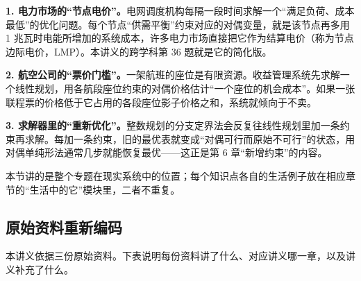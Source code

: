\begin{figure}[!htbp]\centering

\end{figure}
\begin{sciencebox}[三个真实系统里的对偶变量]
\textbf{1. 电力市场的“节点电价”。}电网调度机构每隔一段时间求解一个“满足负荷、成本最低”的优化问题。每个节点“供需平衡”约束对应的对偶变量，就是该节点再多用 1 兆瓦时电能所增加的系统成本，许多电力市场直接把它作为结算电价（称为节点边际电价，LMP）。本讲义的跨学科第 36 题就是它的简化版。

\smallskip
\textbf{2. 航空公司的“票价门槛”。}一架航班的座位是有限资源。收益管理系统先求解一个线性规划，用各航段座位约束的对偶价格估计“一个座位的机会成本”。如果一张联程票的价格低于它占用的各段座位影子价格之和，系统就倾向于不卖。

\smallskip
\textbf{3. 求解器里的“重新优化”。}整数规划的分支定界法会反复往线性规划里加一条约束再求解。每加一条约束，旧的最优表就变成“对偶可行而原始不可行”的状态，用对偶单纯形法通常几步就能恢复最优——这正是第 6 章“新增约束”的内容。

\end{sciencebox}

本节讲的是整个专题在现实系统中的位置；每个知识点各自的生活例子放在相应章节的“生活中的它”模块里，二者不重复。

\subsection*{原始资料重新编码}

本讲义依据三份原始资料。下表说明每份资料讲了什么、对应讲义哪一章，以及讲义补充了什么。

